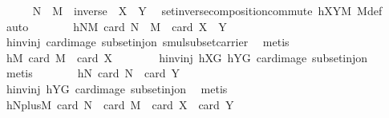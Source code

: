 \begin{isabellebody}
\ \ \ \ \isamarkupfalse%
\ {\isachardoublequoteopen}{\isacharquery}{\kern0pt}N\ {\isasymcdots}\ {\isacharquery}{\kern0pt}M\ {\isacharequal}{\kern0pt}\ inverse\ {\isacharbackquote}{\kern0pt}\ {\isacharparenleft}{\kern0pt}X\ {\isasymcdots}\ Y{\isacharparenright}{\kern0pt}{\isachardoublequoteclose}\ \isamarkupfalse%
\ set{\isacharunderscore}{\kern0pt}inverse{\isacharunderscore}{\kern0pt}composition{\isacharunderscore}{\kern0pt}commute\ hXYM\ M{\isacharunderscore}{\kern0pt}def\ \isamarkupfalse%
\ auto\isanewline
\ \ \ \ \isamarkupfalse%
\ \isamarkupfalse%
\ hNM{\isacharcolon}{\kern0pt}\ {\isachardoublequoteopen}card\ {\isacharparenleft}{\kern0pt}{\isacharquery}{\kern0pt}N\ {\isasymcdots}\ {\isacharquery}{\kern0pt}M{\isacharparenright}{\kern0pt}\ {\isacharequal}{\kern0pt}\ card\ {\isacharparenleft}{\kern0pt}X\ {\isasymcdots}\ Y{\isacharparenright}{\kern0pt}{\isachardoublequoteclose}\ \isanewline
\ \ \ \ \ \ \isamarkupfalse%
\ hinvinj\ card{\isacharunderscore}{\kern0pt}image\ subset{\isacharunderscore}{\kern0pt}inj{\isacharunderscore}{\kern0pt}on\ smul{\isacharunderscore}{\kern0pt}subset{\isacharunderscore}{\kern0pt}carrier\ \isamarkupfalse%
\ metis\isanewline
\ \ \ \ \isamarkupfalse%
\ \isamarkupfalse%
\ hM{\isacharcolon}{\kern0pt}\ {\isachardoublequoteopen}card\ {\isacharquery}{\kern0pt}M\ {\isacharequal}{\kern0pt}\ card\ X{\isachardoublequoteclose}\isanewline
\ \ \ \ \ \ \isamarkupfalse%
\ hinvinj\ hXG\ hYG\ card{\isacharunderscore}{\kern0pt}image\ subset{\isacharunderscore}{\kern0pt}inj{\isacharunderscore}{\kern0pt}on\ \isamarkupfalse%
\ metis\isanewline
\ \ \ \ \isamarkupfalse%
\ \isamarkupfalse%
\ hN{\isacharcolon}{\kern0pt}\ {\isachardoublequoteopen}card\ {\isacharquery}{\kern0pt}N\ {\isacharequal}{\kern0pt}\ card\ Y{\isachardoublequoteclose}\ \isanewline
\ \ \ \ \ \ \isamarkupfalse%
\ hinvinj\ hYG\ card{\isacharunderscore}{\kern0pt}image\ subset{\isacharunderscore}{\kern0pt}inj{\isacharunderscore}{\kern0pt}on\ \isamarkupfalse%
\ metis\isanewline
\ \ \ \ \isamarkupfalse%
\ \isamarkupfalse%
\ hNplusM{\isacharcolon}{\kern0pt}\ {\isachardoublequoteopen}card\ {\isacharquery}{\kern0pt}N\ {\isacharplus}{\kern0pt}\ card\ {\isacharquery}{\kern0pt}M\ {\isacharequal}{\kern0pt}\ card\ X\ {\isacharplus}{\kern0pt}\ card\ Y{\isachardoublequoteclose}\ \isamarkupfalse%

\end{isabellebody}
